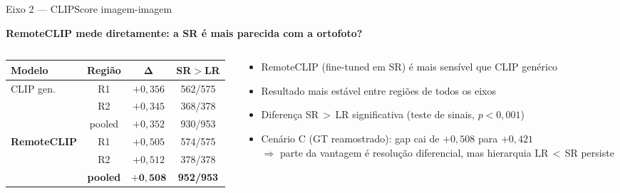 \documentclass[aspectratio=169]{beamer}
\begin{document}
\begin{frame}{Eixo 2 — CLIPScore imagem-imagem}

  \begin{center}
    \textbf{RemoteCLIP mede diretamente: a SR é mais parecida com a ortofoto?}
  \end{center}

  \vspace{0.3em}
  \begin{columns}[T]
    \begin{column}{0.50\textwidth}
      \begin{tabular}{lccc}
        \toprule
        \textbf{Modelo} & \textbf{Região} & $\mathbf{\Delta}$ & \textbf{SR${>}$LR} \\
        \midrule
        \multirow{3}{*}{CLIP gen.}
          & R1     & $+0{,}356$ & 562/575 \\
          & R2     & $+0{,}345$ & 368/378 \\
          & pooled & $+0{,}352$ & 930/953 \\
        \midrule
        \multirow{3}{*}{\textbf{RemoteCLIP}}
          & R1     & $+0{,}505$ & 574/575 \\
          & R2     & $+0{,}512$ & 378/378 \\
          & \textbf{pooled} & $\mathbf{+0{,}508}$ & \textbf{952/953} \\
        \bottomrule
      \end{tabular}
    \end{column}
    \begin{column}{0.46\textwidth}
      \begin{itemize}
        \item RemoteCLIP (fine-tuned em SR) é mais sensível que CLIP genérico
        \item Resultado mais estável entre regiões de todos os eixos
        \item Diferença SR\,$>$\,LR significativa (teste de sinais, $p<0{,}001$)
        \item Cenário C (GT reamostrado): gap cai de $+0{,}508$ para $+0{,}421$\\
              $\Rightarrow$ parte da vantagem é resolução diferencial, mas hierarquia LR\,$<$\,SR persiste
      \end{itemize}
    \end{column}
  \end{columns}

\end{frame}
\end{document}
